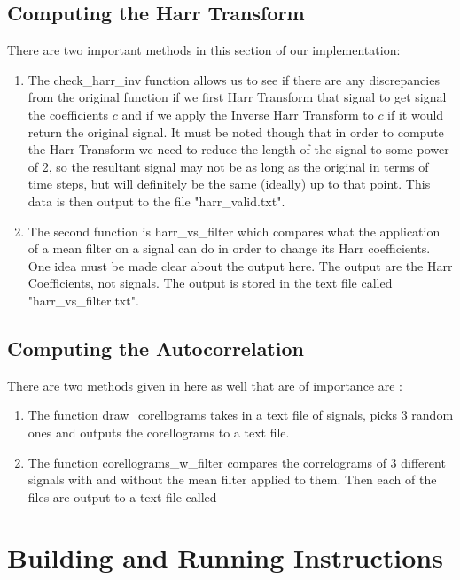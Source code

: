 \documentclass[11pt]{article} %
\begin{document}
\subsection{Computing the Harr Transform}
There are two important methods in this section of our implementation:
\begin{enumerate}
\item The check\_harr\_inv function allows us to see if there are any discrepancies from the original function if we first Harr Transform that signal to get signal the coefficients $c$ and if we apply the Inverse Harr Transform to $c$ if it would return the original signal. It must be noted though that in order to compute the Harr Transform we need to reduce the length of the signal to some power of 2, so the resultant signal may not be as long as the original in terms of time steps, but will definitely be the same (ideally) up to that point.
This data is then output to the file "harr\_valid.txt".


\item The second function is harr\_vs\_filter which compares what the application of a mean filter on a signal can do in order to change its Harr coefficients. One idea must be made clear about the output here. The output are the Harr Coefficients, not signals. The output is stored in the text file called "harr\_vs\_filter.txt". 
\end{enumerate}

\subsection{Computing the Autocorrelation}
There are two methods given in here as well that are of importance are :
\begin{enumerate}
\item The function draw\_corellograms takes in a text file of signals, picks 3 random ones and outputs the corellograms to a text file. 

\item The function corellograms\_w\_filter compares the correlograms of 3 different signals with and without the mean filter applied to them. Then each of the files are output to a text file called 

\end{enumerate}

\section{Building and Running Instructions}
\end{document}
